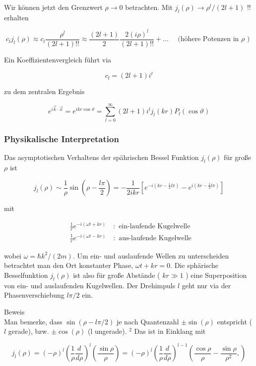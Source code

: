 \documentclass[10pt, letterpaper]{article}
\begin{document}
Wir können jetzt den Grenzwert $\rho \rightarrow 0$ betrachten. Mit $j_{l}(\rho) \rightarrow \rho^{l} /(2 l+1)$ !! erhalten

$$
c_{l} j_{l}(\rho) \approx c_{l} \frac{\rho^{l}}{(2 l+1)!!} \approx \frac{(2 l+1)}{2} \frac{2(i \rho)^{l}}{(2 l+1)!!}+\ldots \quad \text { (höhere Potenzen in } \rho \text { ) }
$$

Ein Koeffizientenvergleich führt via

$$
c_{l}=(2 l+1) i^{l}
$$

zu dem zentralen Ergebnis

$$
e^{i \vec{k} \cdot \vec{x}}=e^{i k r \cos \vartheta}=\sum_{l=0}^{\infty}(2 l+1) i^{l} j_{l}(k r) P_{l}(\cos \vartheta)
$$

\subsubsection*{Physikalische Interpretation}
Das asymptotischen Verhaltens der spährischen Bessel Funktion $j_{l}(\rho)$ für große $\rho$ ist

$$
j_{l}(\rho) \sim \frac{1}{\rho} \sin \left(\rho-\frac{l \pi}{2}\right)=-\frac{1}{2 i k r}\left[e^{-i\left(k r-\frac{1}{2} l \pi\right)}-e^{i\left(k r-\frac{1}{2} l \pi\right)}\right]
$$

mit

$$
\begin{aligned}
& \frac{1}{r} e^{-i(\omega t+k r)} \quad: \text { ein-laufende Kugelwelle } \\
& \frac{1}{r} e^{-i(\omega t-k r)} \quad: \text { aus-laufende Kugelwelle }
\end{aligned}
$$

wobei $\omega=\hbar k^{2} /(2 m)$. Um ein- und auslaufende Wellen zu unterscheiden betrachtet man den Ort konstanter Phase, $\omega t+k r=0$. Die sphärische Besselfunktion $j_{l}(\rho)$ ist also für große Abstände ( $k r \gg 1$ ) eine Superposition von ein- und auslaufenden Kugelwellen. Der Drehimpuls $l$ geht nur via der Phasenverschiebung $l \pi / 2$ ein.

Beweis\\
Man bemerke, dass $\sin (\rho-l \pi / 2)$ je nach Quantenzahl $\pm \sin (\rho)$ entspricht ( $l$ gerade), bzw. $\pm \cos (\rho)$ (l ungerade). ${ }^{2}$ Das ist in Einklang mit

$$
j_{l}(\rho)=(-\rho)^{l}\left(\frac{1}{\rho} \frac{d}{d \rho}\right)^{l}\left(\frac{\sin \rho}{\rho}\right)=(-\rho)^{l}\left(\frac{1}{\rho} \frac{d}{d \rho}\right)^{l-1}\left(\frac{\cos \rho}{\rho}-\frac{\sin \rho}{\rho^{2}},\right)
$$
\end{document}

